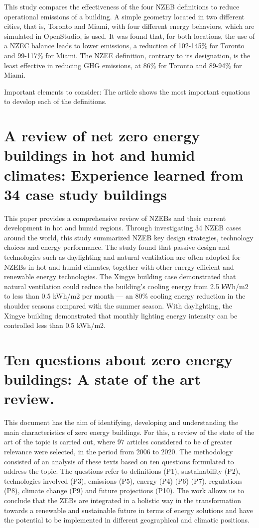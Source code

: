 This study compares the effectiveness of the four NZEB definitions to reduce operational emissions of a building. A simple geometry located in two different cities, that is, Toronto and Miami, with four different energy behaviors, which are simulated in OpenStudio, is used. It was found that, for both locations, the use of a NZEC balance leads to lower emissions, a reduction of 102-145$\%$ for Toronto and 99-117$\%$ for Miami. The NZEE definition, contrary to its designation, is the least effective in reducing GHG emissions, at 86$\%$ for Toronto and 89-94$\%$ for Miami.

Important elements to consider: The article shows the most important equations to develop each of the definitions.


\section{A review of net zero energy buildings in hot and humid climates: Experience learned from 34 case study buildings}
This paper provides a comprehensive review of NZEBs and their current development in hot and humid regions. Through investigating 34 NZEB cases around the world, this study summarized NZEB key design strategies, technology choices and energy performance. The study found that passive design and technologies such as daylighting and natural ventilation are often adopted for NZEBs in hot and humid climates, together with other energy efficient and renewable energy technologies.  The Xingye building case demonstrated that natural ventilation could reduce the building's cooling energy from 2.5 kWh/m2 to less than 0.5 kWh/m2 per month — an 80\% cooling energy reduction in the shoulder seasons compared with the summer season. With daylighting, the Xingye building demonstrated that monthly lighting energy intensity can be controlled less than 0.5 kWh/m2.

\section{Ten questions about zero energy buildings: A state of the art review.}
This document has the aim of identifying, developing and understanding the main characteristics of zero energy buildings. For this, a review of the state of the art of the topic is carried out, where 97 articles considered to be of greater relevance were selected, in the period from 2006 to 2020. The methodology consisted of an analysis of these texts based on ten questions formulated to address the topic. The questions refer to definitions (P1), sustainability (P2), technologies involved (P3), emissions (P5), energy (P4) (P6) (P7), regulations (P8), climate change (P9) and future projections (P10). The work allows us to conclude that the ZEBs are integrated in a holistic way in the transformation towards a renewable and sustainable future in terms of energy solutions and have the potential to be implemented in different geographical and climatic positions.


